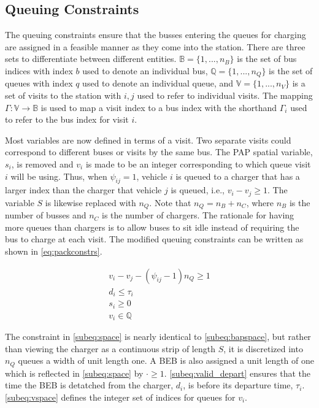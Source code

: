 \documentclass[11pt,a4paper,final]{article}
\begin{document}
\subsection{Queuing Constraints}
\label{sec:queuing}
\noindent
The queuing constraints ensure that the busses entering the queues for charging are assigned in a feasible manner as
they come into the station. There are three sets to differentiate between different entities. \(\mathbb{B} = \{1, ...,
n_B\}\) is the set of bus indices with index \(b\) used to denote an individual bus, \(\mathbb{Q} = \{1, ..., n_Q\}\) is the set of
queues with index \(q\) used to denote an individual queue, and \(\mathbb{V} = \{1, ..., n_V\}\) is a set of visits to the
station with \(i,j\) used to refer to individual visits. The mapping \(\Gamma: \mathbb{V} \rightarrow \mathbb{B}\) is used to map a visit
index to a bus index with the shorthand \(\Gamma_i\) used to refer to the bus index for visit \(i\).

Most variables are now defined in terms of a visit. Two separate visits could correspond to different buses or visits by
the same bus. The PAP spatial variable, \(s_i\), is removed and \(v_i\) is made to be an integer corresponding to which
queue visit \(i\) will be using. Thus, when \(\psi_{ij} = 1\), vehicle \(i\) is queued to a charger that has a larger index than
the charger that vehicle \(j\) is queued, i.e., \(v_i-v_j \geq 1\). The variable \(S\) is likewise replaced with \(n_Q\). Note that
\(n_Q = n_B + n_C\), where \(n_B\) is the number of busses and \(n_C\) is the number of chargers. The rationale for having
more queues than chargers is to allow buses to sit idle instead of requiring the bus to charge at each visit. The
modified queuing constraints can be written as shown in \autoref{eq:packconstrs}.

\begin{subequations}
\label{eq:packconstrs}
\begin{align}
    v_i - v_j - (\psi_{ij} - 1)n_Q \geq 1       \label{subeq:space}        \\
    d_i \leq \tau_i                             \label{subeq:valid_depart} \\
    s_i \geq 0                               \label{subeq:pos_charge} \\
    v_i \in \mathbb{Q}                       \label{subeq:vspace}
\end{align}
\end{subequations}

The constraint in \autoref{subeq:space} is nearly identical to \autoref{subeq:bapspace}, but rather than viewing the
charger as a continuous strip of length \(S\), it is discretized into \(n_Q\) queues a width of unit length one. A BEB is
also assigned a unit length of one which is reflected in \autoref{subeq:space} by \(\cdot \geq 1\). \autoref{subeq:valid_depart}
ensures that the time the BEB is detatched from the charger, \(d_i\), is before its departure time, \(\tau_i\).
\autoref{subeq:vspace} defines the integer set of indices for queues for \(v_i\).
\end{document}
